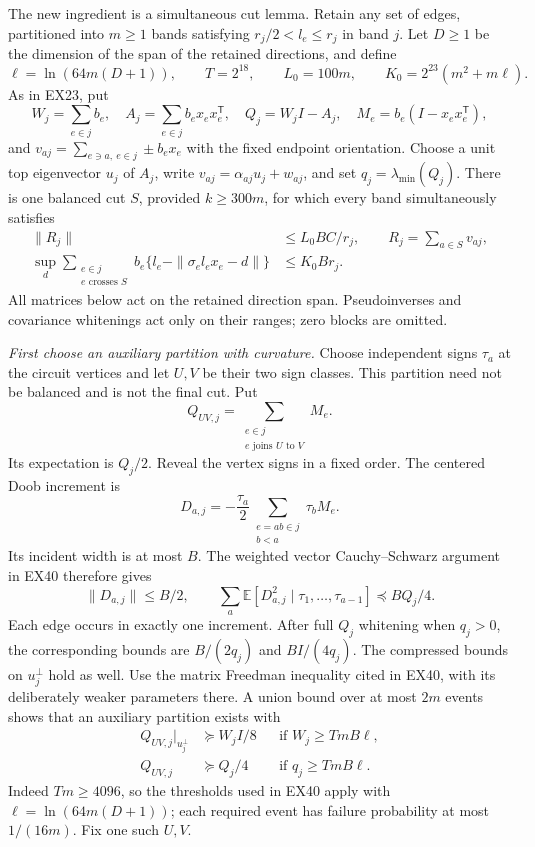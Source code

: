 The new ingredient is a simultaneous cut lemma. Retain any set of
edges, partitioned into $m\ge1$ bands satisfying
$r_j/2<l_e\le r_j$ in band $j$. Let $D\ge1$ be the dimension of the
span of the retained directions, and define
\[
 \ell=\ln(64m(D+1)),\qquad T=2^{18},\qquad
 L_0=100m,\qquad K_0=2^{23}(m^2+m\ell).
\]
As in EX23, put
\[
 W_j=\sum_{e\in j}b_e,\quad A_j=\sum_{e\in j}b_ex_ex_e^{\mathsf T},
 \quad Q_j=W_jI-A_j,\quad M_e=b_e(I-x_ex_e^{\mathsf T}),
\]
and
$v_{aj}=\sum_{e\ni a,\ e\in j}\pm b_ex_e$ with the fixed endpoint
orientation. Choose a unit top eigenvector $u_j$ of $A_j$, write
$v_{aj}=\alpha_{aj}u_j+w_{aj}$, and set
$q_j=\lambda_{\min}(Q_j)$. There is one balanced cut $S$, provided
$k\ge300m$, for which every band simultaneously satisfies
\begin{align}
 \|R_j\|&\le L_0BC/r_j,\qquad R_j=\sum_{a\in S}v_{aj},
 \tag{EX42.2}\\
 \sup_d\sum_{\substack{e\in j\\ e\text{ crosses }S}}
 b_e\{l_e-\|\sigma_el_ex_e-d\|\}&\le K_0Br_j.
 \tag{EX42.3}
\end{align}
All matrices below act on the retained direction span. Pseudoinverses
and covariance whitenings act only on their ranges; zero blocks are
omitted.

\emph{First choose an auxiliary partition with curvature.}
Choose independent signs $\tau_a$ at the circuit vertices and let
$U,V$ be their two sign classes. This partition need not be balanced
and is not the final cut. Put
\[
 Q_{UV,j}=\sum_{\substack{e\in j\\e\text{ joins }U\text{ to }V}}M_e.
\]
Its expectation is $Q_j/2$. Reveal the vertex signs in a fixed order.
The centered Doob increment is
\[
 D_{a,j}=-\frac{\tau_a}{2}
       \sum_{\substack{e=ab\in j\\b<a}}\tau_bM_e.
\]
Its incident width is at most $B$. The weighted vector
Cauchy--Schwarz argument in EX40 therefore gives
\[
 \|D_{a,j}\|\le B/2,\qquad
 \sum_a\mathbb E[D_{a,j}^2\mid\tau_1,\ldots,\tau_{a-1}]
       \preceq BQ_j/4.
 \tag{EX42.4}
\]
Each edge occurs in exactly one increment. After full $Q_j$ whitening
when $q_j>0$, the corresponding bounds are $B/(2q_j)$ and
$BI/(4q_j)$. The compressed bounds on $u_j^\perp$ hold as well.
Use the matrix Freedman inequality cited in EX40, with its deliberately
weaker parameters there. A union bound over at most $2m$ events shows
that an auxiliary partition exists with
\begin{align}
 Q_{UV,j}|_{u_j^\perp}&\succeq W_jI/8
       &&\text{if }W_j\ge TmB\ell,\tag{EX42.5}\\
 Q_{UV,j}&\succeq Q_j/4
       &&\text{if }q_j\ge TmB\ell.\tag{EX42.6}
\end{align}
Indeed $T m\ge4096$, so the thresholds used in EX40 apply with
$\ell=\ln(64m(D+1))$; each required event has failure probability
at most $1/(16m)$. Fix one such $U,V$.

